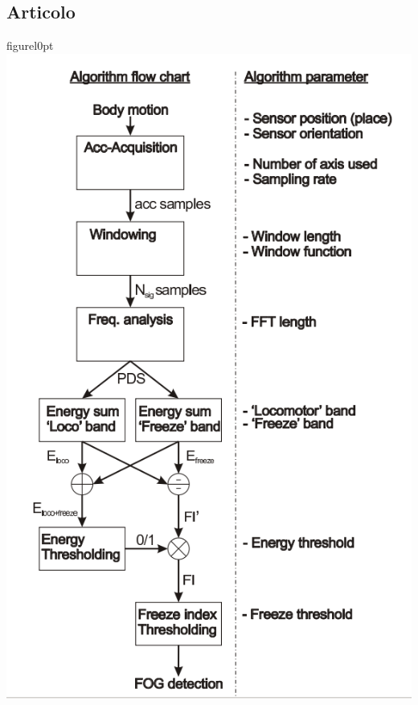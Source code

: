 \documentclass[a4paper,11pt]{article} %
\begin{document}
\subsection{Articolo}
\begin{wrapfloat}{figure}{l}{0pt}
\includegraphics[scale=0.2]{Flow_chart_FOG.png}
\caption{Flow chart che descrive l'algoritmo di detenzione del FoG e tutti i suoi paramentri}
\end{wrapfloat}
\end{document}
